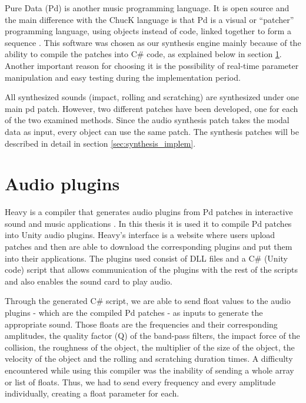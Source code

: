 Pure Data (Pd) is another music programming language. It is open source and the main difference with the ChucK language is that \gls{Pd} is a visual or ``patcher'' programming language, using objects instead of code, linked together to form a sequence \cite{bib:pd}. This software was chosen as our synthesis engine mainly because of the ability to compile the patches into C\# code, as explained below in section \ref{sec:heavy}. Another important reason for choosing it is the possibility of real-time parameter manipulation and easy testing during the implementation period.

All synthesized sounds (impact, rolling and scratching) are synthesized under one main pd patch. However, two different patches have been developed, one for each of the two examined methods. Since the audio synthesis patch takes the modal data as input, every object can use the same patch. The synthesis patches will be described in detail in section \ref{sec:synthesis_implem}.



\section{Audio plugins}\label{sec:heavy}

Heavy is a compiler that generates audio plugins from \gls{Pd} patches in interactive sound and music applications \cite{bib:heavy}. In this thesis it is used it to compile \gls{Pd} patches into Unity\textsuperscript{\textregistered} audio plugins. Heavy's interface is a website where users upload patches and then are able to download the corresponding plugins and put them into their applications. The plugins used consist of DLL files and a C\# (Unity\textsuperscript{\textregistered} code) script that allows communication of the plugins with the rest of the scripts and also enables the sound card to play audio.

Through the generated C\# script, we are able to send float values to the audio plugins - which are the compiled \gls{Pd} patches - as inputs to generate the appropriate sound. Those floats are the frequencies and their corresponding amplitudes, the quality factor (\gls{Q}) of the band-pass filters, the impact force of the collision, the roughness of the object, the multiplier of the size of the object, the velocity of the object and the rolling and scratching duration times. A difficulty encountered while using this compiler was the inability of sending a whole array or list of floats. Thus, we had to send every frequency and every amplitude individually, creating a float parameter for each.
 

